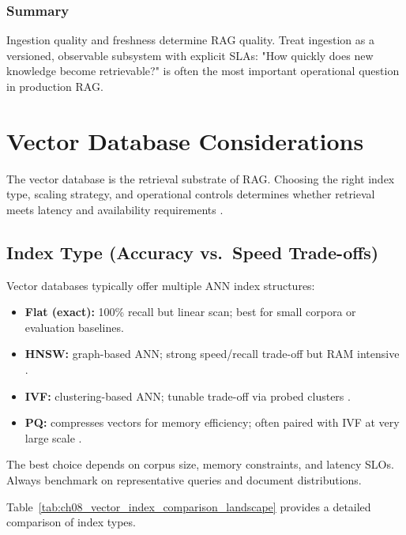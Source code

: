 \subsubsection*{Summary}
Ingestion quality and freshness determine RAG quality. Treat ingestion as a versioned, observable subsystem with explicit SLAs: "How quickly does new knowledge become retrievable?" is often the most important operational question in production RAG.

\FloatBarrier
\section{Vector Database Considerations}
\label{sec:rag-vector-database-considerations}
The vector database is the retrieval substrate of RAG. Choosing the right index type, scaling strategy, and operational controls determines whether retrieval meets latency and availability requirements \cite{Johnson2019FAISS,Malkov2018HNSW,Jegou2011PQ}.

\subsection{Index Type (Accuracy vs.\ Speed Trade-offs)}
Vector databases typically offer multiple ANN index structures:
\begin{itemize}
    \item \textbf{Flat (exact):} 100\% recall but linear scan; best for small corpora or evaluation baselines.
    \item \textbf{HNSW:} graph-based ANN; strong speed/recall trade-off but RAM intensive \cite{Malkov2018HNSW}.
    \item \textbf{IVF:} clustering-based ANN; tunable trade-off via probed clusters \cite{Johnson2019FAISS}.
    \item \textbf{PQ:} compresses vectors for memory efficiency; often paired with IVF at very large scale \cite{Jegou2011PQ}.
\end{itemize}
The best choice depends on corpus size, memory constraints, and latency SLOs. Always benchmark on representative queries and document distributions.

Table~\ref{tab:ch08_vector_index_comparison_landscape} provides a detailed comparison of index types.

